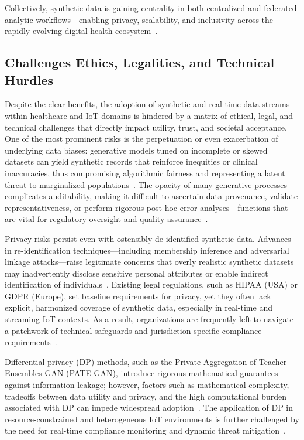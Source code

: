 \documentclass[sigconf]{acmart}
\begin{document}
Collectively, synthetic data is gaining centrality in both centralized and federated analytic workflows—enabling privacy, scalability, and inclusivity across the rapidly evolving digital health ecosystem~\cite{ref91,ref106}.

\subsection{Challenges Ethics, Legalities, and Technical Hurdles}

Despite the clear benefits, the adoption of synthetic and real-time data streams within healthcare and IoT domains is hindered by a matrix of ethical, legal, and technical challenges that directly impact utility, trust, and societal acceptance. One of the most prominent risks is the perpetuation or even exacerbation of underlying data biases: generative models tuned on incomplete or skewed datasets can yield synthetic records that reinforce inequities or clinical inaccuracies, thus compromising algorithmic fairness and representing a latent threat to marginalized populations~\cite{ref91}. The opacity of many generative processes complicates auditability, making it difficult to ascertain data provenance, validate representativeness, or perform rigorous post-hoc error analyses—functions that are vital for regulatory oversight and quality assurance~\cite{ref106}.

Privacy risks persist even with ostensibly de-identified synthetic data. Advances in re-identification techniques—including membership inference and adversarial linkage attacks—raise legitimate concerns that overly realistic synthetic datasets may inadvertently disclose sensitive personal attributes or enable indirect identification of individuals~\cite{ref91,ref106}. Existing legal regulations, such as HIPAA (USA) or GDPR (Europe), set baseline requirements for privacy, yet they often lack explicit, harmonized coverage of synthetic data, especially in real-time and streaming IoT contexts. As a result, organizations are frequently left to navigate a patchwork of technical safeguards and jurisdiction-specific compliance requirements~\cite{ref2,ref4,ref5,ref6,ref7,ref8,ref9,ref10,ref24,ref25,ref28,ref30,ref31,ref33,ref34,ref35,ref36,ref41,ref43,ref46,ref50,ref54,ref51,ref61,ref62,ref63,ref64,ref65,ref70,ref71,ref72,ref75,ref76,ref77,ref78,ref79,ref82,ref83,ref84,ref90,ref91}.

Differential privacy (DP) methods, such as the Private Aggregation of Teacher Ensembles GAN (PATE-GAN), introduce rigorous mathematical guarantees against information leakage; however, factors such as mathematical complexity, tradeoffs between data utility and privacy, and the high computational burden associated with DP can impede widespread adoption~\cite{ref91}. The application of DP in resource-constrained and heterogeneous IoT environments is further challenged by the need for real-time compliance monitoring and dynamic threat mitigation~\cite{ref2,ref4,ref5,ref6,ref7,ref8,ref9,ref10,ref24,ref25,ref28,ref30,ref31,ref33,ref34,ref35,ref36,ref41,ref43,ref46,ref50,ref54,ref51,ref61,ref62,ref63,ref64,ref65,ref70,ref71,ref72,ref75,ref76,ref77,ref78,ref79,ref82,ref83,ref84,ref90,ref91}.
\end{document}
